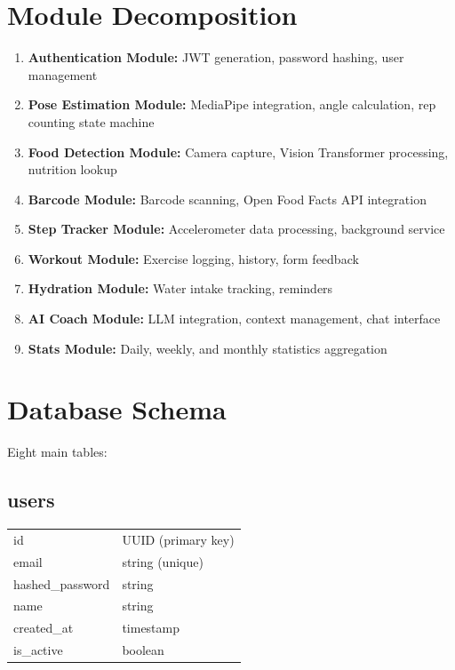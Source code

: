 \documentclass[12pt]{report}
\begin{document}
\section{Module Decomposition}
\begin{enumerate}
    \item \textbf{Authentication Module:} JWT generation, password hashing, user management
    \item \textbf{Pose Estimation Module:} MediaPipe integration, angle calculation, rep counting state machine
    \item \textbf{Food Detection Module:} Camera capture, Vision Transformer processing, nutrition lookup
    \item \textbf{Barcode Module:} Barcode scanning, Open Food Facts API integration
    \item \textbf{Step Tracker Module:} Accelerometer data processing, background service
    \item \textbf{Workout Module:} Exercise logging, history, form feedback
    \item \textbf{Hydration Module:} Water intake tracking, reminders
    \item \textbf{AI Coach Module:} LLM integration, context management, chat interface
    \item \textbf{Stats Module:} Daily, weekly, and monthly statistics aggregation
\end{enumerate}

\section{Database Schema}
Eight main tables:

\subsection*{users}
\begin{tabular}{|l|l|}
\hline
id & UUID (primary key) \\
email & string (unique) \\
hashed\_password & string \\
name & string \\
created\_at & timestamp \\
is\_active & boolean \\ \hline
\end{tabular}
\end{document}
